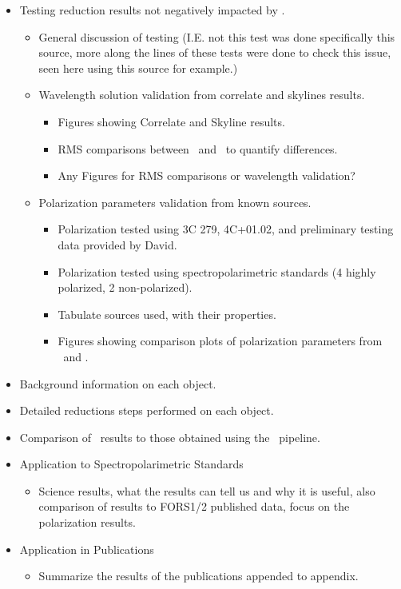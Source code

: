 \begin{itemize}
    \item Testing reduction results not negatively impacted by \stops.
    \begin{itemize}
        \item General discussion of testing (I.E. not this test was done specifically this source, more along the lines of these tests were done to check this issue, seen here using this source for example.)
        \item Wavelength solution validation from correlate and skylines results.
        \begin{itemize}
            \item Figures showing Correlate and Skyline results.
            \item RMS comparisons between \polsalt\ and \iraf\ to quantify differences.
            \item Any Figures for RMS comparisons or wavelength validation?
        \end{itemize}
        \item Polarization parameters validation from known sources.
        \begin{itemize}
            \item Polarization tested using 3C 279, 4C+01.02, and preliminary testing data provided by David.
            \item Polarization tested using spectropolarimetric standards (4 highly polarized, 2 non-polarized).
            \item Tabulate sources used, with their properties.
            \item Figures showing comparison plots of polarization parameters from \polsalt\ and \stops.
        \end{itemize}
    \end{itemize}
\end{itemize}

\begin{itemize}
    \item Background information on each object.
    \item Detailed reductions steps performed on each object.
    \item Comparison of \polsalt\ results to those obtained using the \stops\ pipeline.
\end{itemize}

\begin{itemize}
    \item Application to Spectropolarimetric Standards
    \begin{itemize}
        \item Science results, what the results can tell us and why it is useful, also comparison of results to FORS1/2 published data, focus on the polarization results.
    \end{itemize}
    
    \item Application in Publications
    \begin{itemize}
        \item Summarize the results of the publications appended to appendix.
    \end{itemize}
\end{itemize}

